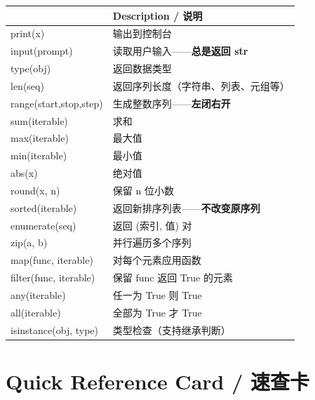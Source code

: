 \documentclass[11pt,a4paper]{report}
\begin{document}
\medskip
\renewcommand{\arraystretch}{1.5}
\centering
\begin{tabularx}{\textwidth}{@{}>{\ttfamily}l>{\raggedright\arraybackslash}X@{}}
\toprule
\multicolumn{1}{@{}l}{\textbf{Function}} & \textbf{Description / 说明} \\ \midrule
print(x)                & 输出到控制台 \\
input(prompt)           & 读取用户输入——\textbf{总是返回 str} \\
type(obj)               & 返回数据类型 \\
len(seq)                & 返回序列长度（字符串、列表、元组等） \\
range(start,stop,step)  & 生成整数序列——\textbf{左闭右开} \\
sum(iterable)           & 求和 \\
max(iterable)           & 最大值 \\
min(iterable)           & 最小值 \\
abs(x)                  & 绝对值 \\
round(x, n)             & 保留 n 位小数 \\
sorted(iterable)        & 返回新排序列表——\textbf{不改变原序列} \\
enumerate(seq)          & 返回 (索引, 值) 对 \\
zip(a, b)               & 并行遍历多个序列 \\
map(func, iterable)     & 对每个元素应用函数 \\
filter(func, iterable)  & 保留 func 返回 True 的元素 \\
any(iterable)           & 任一为 True 则 True \\
all(iterable)           & 全部为 True 才 True \\
isinstance(obj, type)   & 类型检查（支持继承判断） \\
\bottomrule
\end{tabularx}
\medskip

\newpage

\chapter{Quick Reference Card / 速查卡}
\end{document}
